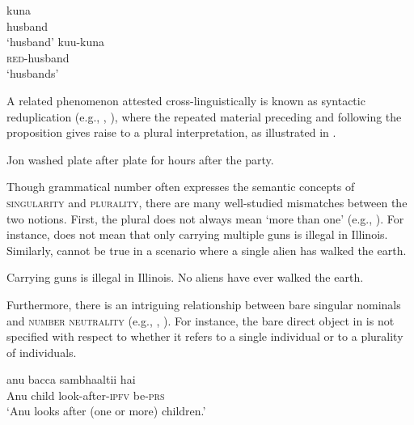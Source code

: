 \documentclass[output=paper]{langscibook}
\begin{document}
\ea\label{doc-wag:ex:reduplication}
\ea
\gll kuna\\  
     husband\\
\glt `husband'
\ex \gll kuu-kuna\\  
     \textsc{red}-husband\\ 
\glt `husbands' \hfill \citep[Papago, Uto-Aztecan;][308, adapted]{moravcsik1978reduplicative}
\z
\z

\noindent A related phenomenon attested cross-linguistically is known as syntactic reduplication (e.g., \citealt{travis2001syntax}, ), where the repeated material preceding and following the proposition gives raise to a plural interpretation, as illustrated in .

\ea Jon washed plate after plate for hours after the party. \hfill \citep[457]{travis2001syntax}\label{doc-wag:ex:syntactic-reduplication}
\z 

\noindent Though grammatical number often expresses the semantic concepts of \textsc{singularity} and \textsc{plurality}, there are many well-studied mismatches between the two notions. %
First, the plural does not always mean `more than one' (e.g., \citealt{sauerland2003new, spector2007aspects, zweig2009number}). For instance,  does not mean that only carrying multiple guns is illegal in Illinois. Similarly,  cannot be true in a scenario where a single alien has walked the earth.

\ea \ea Carrying guns is illegal in Illinois.\label{doc-wag:ex:mismatch-guns} 
\ex No aliens have ever walked the earth.\hfill \citep[267]{nouwen2016plurality}\label{doc-wag:ex:mismatch-aliens}
\z
\z

\noindent Furthermore, there is an intriguing relationship between bare singular nominals and \textsc{number neutrality} (e.g., \citealt{rullmann_you2006general, dayal2011hindi}, ). For instance, the bare direct object in  is not specified with respect to whether it refers to a single individual or to a plurality of individuals.

\ea \gll anu bacca sambhaaltii hai\\
Anu child look-after-\textsc{ipfv} be-\textsc{prs}\\
\glt `Anu looks after (one or more) children.' \hfill \citep[Hindi;][127, adapted]{dayal2011hindi}\label{doc-wag:ex:bare}
\z
\end{document}
